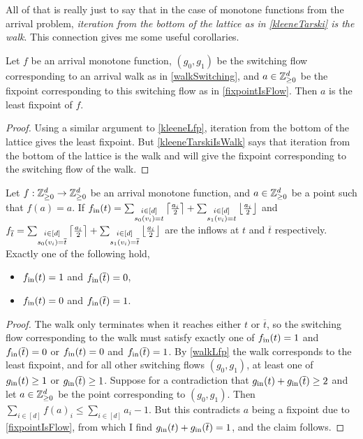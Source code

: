   All of that is really just to say that in the case of monotone functions from the arrival problem,
  \emph{iteration from the bottom of the lattice as in \cref{kleeneTarski} is the walk}. This connection gives
  me some useful corollaries.
  \begin{cor}\label{walkLfp}
    Let $f$ be an arrival monotone function, 
    $(g_0, g_1)$ be the switching flow corresponding to an arrival walk as in \cref{walkSwitching},
    and $a \in \mathbb{Z}_{\geq 0}^d$ be the fixpoint corresponding to this switching flow as in \cref{fixpointIsFlow}.
    Then $a$ is the least fixpoint of $f$.
  \end{cor}
  \begin{proof}
    Using a similar argument to \cref{kleeneLfp}, iteration from the bottom of the lattice gives the least
    fixpoint. But \cref{kleeneTarskiIsWalk} says that iteration from the bottom of the lattice is the walk
    and will give the fixpoint corresponding to the switching flow of the walk.
  \end{proof}
  \begin{cor}
    Let $f : \mathbb{Z}_{\geq 0}^d \to \mathbb{Z}_{\geq 0}^d$ be an arrival monotone function, and $a \in \mathbb{Z}_{\geq 0}^d$ be a point
    such that $f(a) = a$. If 
    $f_{\text{in}} (t) = \sum_{\substack{i \in [d] \\ s_0(v_i) = t}}  \left\lceil \frac{a_i}{2} \right\rceil +
    \sum_{\substack{i \in [d] \\ s_1(v_i) = t}}  \left\lfloor \frac{a_i}{2} \right\rfloor$ and
    $f_{\overline{t}} = \sum_{\substack{i \in [d] \\ s_0(v_i) = \overline{t}}}  \left\lceil \frac{a_i}{2} \right\rceil +
    \sum_{\substack{i \in [d] \\ s_1(v_i) = \overline{t}}}  \left\lfloor \frac{a_i}{2} \right\rfloor$ are the inflows at $t$ and $\overline{t}$
    respectively. Exactly one of the following hold,
    \begin{itemize}
      \item $f_{\text{in}} (t) = 1$ and $f_{\text{in}} (\overline{t}) = 0$,
      \item $f_{\text{in}} (t) = 0$ and $f_{\text{in}} (\overline{t}) = 1$.
    \end{itemize}
  \end{cor}
  \begin{proof}
    The walk only terminates when it reaches either $t$ or $\overline{t}$, so the switching flow corresponding
    to the walk must satisfy exactly one of $f_{\text{in}}(t) = 1$ and $f_{\text{in}}(\overline{t}) = 0$ or 
    $f_{\text{in}}(t) = 0$ and $f_{\text{in}}(\overline{t}) = 1$. By \cref{walkLfp} the walk corresponds
    to the least fixpoint, and for all other switching flows $(g_0, g_1)$, at least one of $g_{\text{in}} (t) \geq 1$ or
    $g_{\text{in}} (\overline{t}) \geq 1$. Suppose for a contradiction that $g_{\text{in}} (t) + g_{\text{in}} (\overline{t}) \geq 2$ and let
    $a \in \mathbb{Z}_{\geq 0}^d$ be the point corresponding to $(g_0, g_1)$. Then
    $\sum_{i \in [d]} f(a)_i \leq \sum_{i \in [d]} a_i - 1$. But this contradicts $a$ being a fixpoint due to
    \cref{fixpointIsFlow}, from which I find $g_{\text{in}} (t) + g_{\text{in}} (\overline{t}) = 1$, and the claim follows.
  \end{proof}
